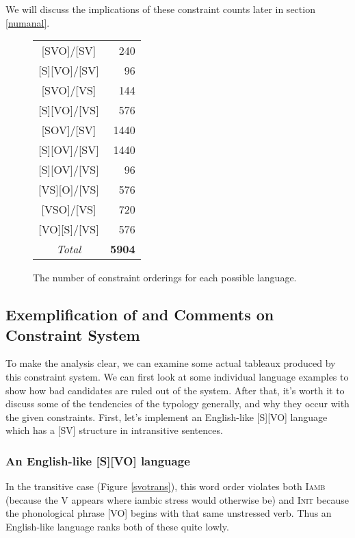 \documentclass{article}
\newcommand{\iamb}{\textsc{Iamb}}
\newcommand{\initphi}{\textsc{Init\textphi}}
\begin{document}
We will discuss the implications of these constraint counts later in section \ref{numanal}.

\begin{figure}
	\centering
	\begin{tabular}{cr}
		{}[SVO]/[SV] & 240\\
		{}[S][VO]/[SV] & 96\\
		{}[SVO]/[VS] & 144\\
		{}[S][VO]/[VS] & 576\\
		{}[SOV]/[SV] & 1440\\
		{}[S][OV]/[SV] & 1440\\
		{}[S][OV]/[VS] & 96\\
		{}[VS][O]/[VS] & 576\\
		{}[VSO]/[VS] & 720\\
		{}[VO][S]/[VS] & 576\\\hline
		\emph{Total} & \textbf{5904}\\
	\end{tabular}
	\caption{The number of constraint orderings for each possible language.\label{connum}}
\end{figure}


\subsection{Exemplification of and Comments on Constraint System}

To make the analysis clear, we can examine some actual tableaux produced by this constraint system.
We can first look at some individual language examples to show how bad candidates are ruled out of the system.
After that, it's worth it to discuss some of the tendencies of the typology generally, and why they occur with the given constraints.
First, let's implement an English-like [S][VO] language which has a [SV] structure in intransitive sentences.

\subsubsection{An English-like [S][VO] language}

In the transitive case (Figure \ref{svotrans}), this word order violates both {\iamb} (because the V appears where iambic stress would otherwise be) and {\initphi} because the phonological phrase [VO] begins with that same unstressed verb.
Thus an English-like language ranks both of these quite lowly.
\end{document}

